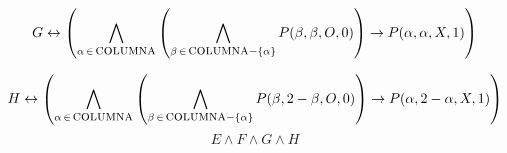 \documentclass{minimal}
\begin{document}
$$G \leftrightarrow \left( \bigwedge_{\alpha \,{\in}\,\mbox{\textsc{columna}}} \left(\bigwedge_{\beta \,{\in}\,\mbox{\textsc{columna}}- \{\alpha\}} P(\beta,\beta,O,0) \right) \rightarrow P(\alpha,\alpha,X,1)\right) $$

$$H \leftrightarrow \left( \bigwedge_{\alpha \,{\in}\,\mbox{\textsc{columna}}} \left(\bigwedge_{\beta \,{\in}\,\mbox{\textsc{columna}}- \{\alpha\}} P(\beta,2 - \beta,O,0) \right) \rightarrow P(\alpha,2 - \alpha,X,1)\right) $$
\[E\wedge F\wedge G\wedge H\]
\end{document}
